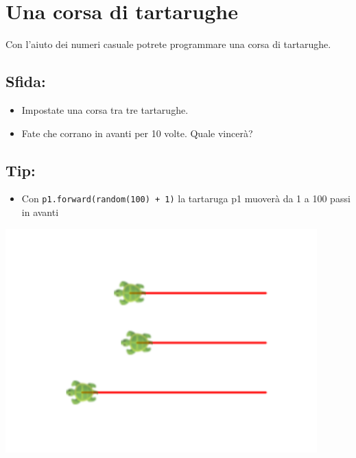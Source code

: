 \chapter{Una corsa di tartarughe}
\begin{multicols}{2}
Con l'aiuto dei numeri casuale potrete programmare una corsa di tartarughe.
\section*{\color{BrickRed}Sfida:}


\begin{itemize}

\item {Impostate una corsa tra tre tartarughe.}
\item {Fate che corrano in avanti per 10 volte. Quale vincerà?}

\end{itemize}


\section*{\color{OliveGreen}Tip:}


\begin{itemize}

\item {Con \lstinline{p1.forward(random(100) + 1)} la tartaruga p1 muoverà da 1 a 100 passi in avanti}

\end{itemize}



\columnbreak

\begin{center}
\includegraphics[width=12.0cm]{../img/race.png}
\end{center}

\end{multicols}

